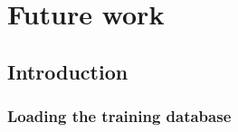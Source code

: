\chapter{Future work}
\label{chap:future}


\section{Introduction}




\subsection{Loading the training database}  

